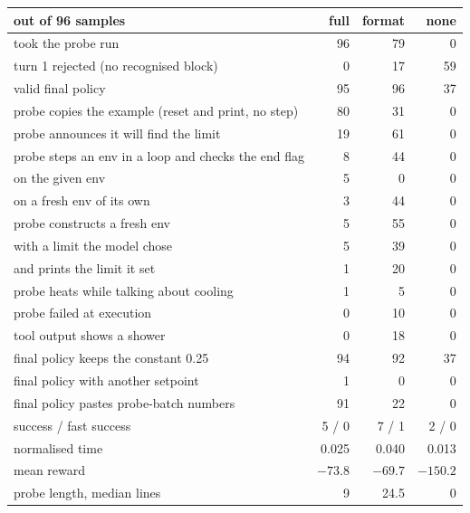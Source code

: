 \documentclass[11pt,a4paper]{article}
\begin{document}
\begin{center}\small
\begin{tabular}{lrrr}
\toprule
out of 96 samples & full & format & none \\
\midrule
took the probe run                                   & 96 & 79 & 0 \\
turn 1 rejected (no recognised block)                & 0  & 17 & 59 \\
valid final policy                                   & 95 & 96 & 37 \\
probe copies the example (reset and print, no step)  & 80 & 31 & 0 \\
probe announces it will find the limit               & 19 & 61 & 0 \\
probe steps an env in a loop and checks the end flag & 8  & 44 & 0 \\
\quad on the given env                               & 5  & 0  & 0 \\
\quad on a fresh env of its own                      & 3  & 44 & 0 \\
probe constructs a fresh env                         & 5  & 55 & 0 \\
\quad with a limit the model chose                   & 5  & 39 & 0 \\
\quad and prints the limit it set                    & 1  & 20 & 0 \\
probe heats while talking about cooling              & 1  & 5  & 0 \\
probe failed at execution                            & 0  & 10 & 0 \\
tool output shows a shower                           & 0  & 18 & 0 \\
final policy keeps the constant 0.25                 & 94 & 92 & 37 \\
final policy with another setpoint                   & 1  & 0  & 0 \\
final policy pastes probe-batch numbers              & 91 & 22 & 0 \\
success / fast success                               & 5 / 0 & 7 / 1 & 2 / 0 \\
normalised time                                      & 0.025 & 0.040 & 0.013 \\
mean reward                                          & $-73.8$ & $-69.7$ & $-150.2$ \\
probe length, median lines                           & 9 & 24.5 & 0 \\
\bottomrule
\end{tabular}
\end{center}
\end{document}
